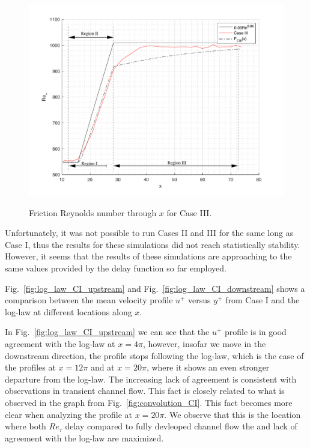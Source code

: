 \documentclass[twocolumn,10pt]{asme2e}
\begin{document}
\begin{figure}[t]
\centering
\scalebox{0.4}
{\includegraphics{convolution_CIII.pdf}}
\caption{Friction Reynolds number through \(x\) for Case III.}
\label{fig:convolution_CIII}
\end{figure}

Unfortunately, it was not possible to run Cases II and III for the same long as Case I, thus the results for these simulations did not reach statistically stability. However, it seems that the results of these simulations are approaching to the same values provided by the delay function so far employed.

Fig.~\ref{fig:log_law_CI_upstream} and Fig.~\ref{fig:log_law_CI_downstream} shows a comparison between the mean velocity profile \(u^+\) versus \(y^+\) from Case I and the log-law at different locations along \(x\).

In Fig.~\ref{fig:log_law_CI_upstream} we can see that the \(u^+\) profile is in good agreement with the log-law at \(x=4{\pi}\), however, insofar we move in the downstream direction, the profile stops following the log-law, which is the case of the profiles at \(x=12{\pi}\) and at \(x=20{\pi}\), where it shows an even stronger departure from the log-law. The increasing lack of agreement is consistent with observations in transient channel flow. This fact is closely related to what is observed in the graph from Fig.~\ref{fig:convolution_CI}. This fact becomes more clear when analyzing the profile at \(x=20{\pi}\). We observe  that this is the location where both \(Re_{\tau}\) delay compared to fully devleoped channel flow the and lack of agreement with the log-law are maximized.
\end{document}
